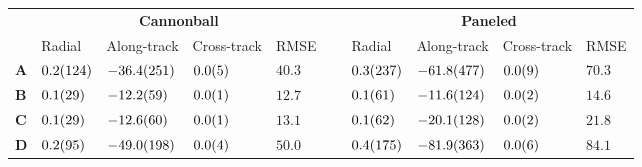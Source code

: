 \begin{tabular}{llllllllll}
\toprule
 & \multicolumn{4}{c}{\bfseries Cannonball} & \bfseries  & \multicolumn{4}{c}{\bfseries Paneled} \\
 & Radial & Along-track & Cross-track & RMSE &  & Radial & Along-track & Cross-track & RMSE \\
\cmidrule{2-5}\cmidrule{7-10}
\bfseries A & $\num{+0.2 \pm 12.4}$ & $\num{-36.4 \pm 25.1}$ & $\num{+0.0 \pm 0.5}$ & $\num{40.3}$ & ~ & $\num{+0.3 \pm 23.7}$ & $\num{-61.8 \pm 47.7}$ & $\num{+0.0 \pm 0.9}$ & $\num{70.3}$ \\
\bfseries B & $\num{+0.1 \pm 2.9}$ & $\num{-12.2 \pm 5.9}$ & $\num{+0.0 \pm 0.1}$ & $\num{12.7}$ & ~ & $\num{+0.1 \pm 6.1}$ & $\num{-11.6 \pm 12.4}$ & $\num{+0.0 \pm 0.2}$ & $\num{14.6}$ \\
\bfseries C & $\num{+0.1 \pm 2.9}$ & $\num{-12.6 \pm 6.0}$ & $\num{+0.0 \pm 0.1}$ & $\num{13.1}$ & ~ & $\num{+0.1 \pm 6.2}$ & $\num{-20.1 \pm 12.8}$ & $\num{+0.0 \pm 0.2}$ & $\num{21.8}$ \\
\bfseries D & $\num{+0.2 \pm 9.5}$ & $\num{-49.0 \pm 19.8}$ & $\num{+0.0 \pm 0.4}$ & $\num{50.0}$ & ~ & $\num{+0.4 \pm 17.5}$ & $\num{-81.9 \pm 36.3}$ & $\num{+0.0 \pm 0.6}$ & $\num{84.1}$ \\
\bottomrule
\end{tabular}
